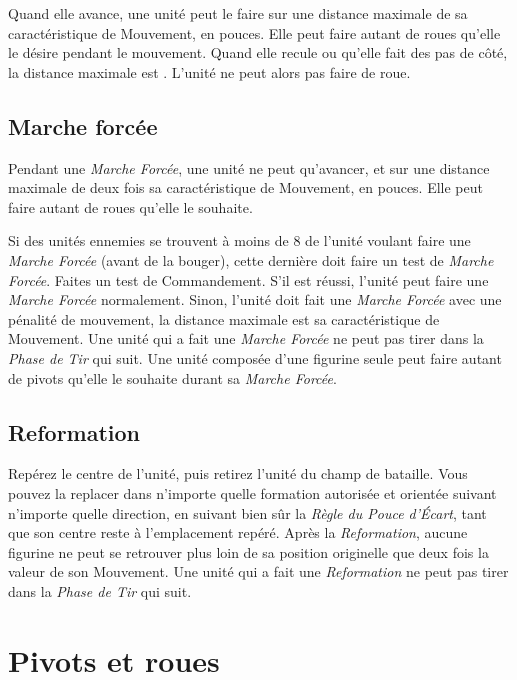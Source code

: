 Quand elle avance, une unité peut le faire sur une distance maximale de sa caractéristique de Mouvement, en pouces. Elle peut faire autant de roues qu'elle le désire pendant le mouvement. Quand elle recule ou qu'elle fait des pas de côté, la distance maximale est . L'unité ne peut alors pas faire de roue.

\subsection{Marche forcée}

Pendant une \emph{Marche Forcée}, une unité ne peut qu'avancer, et sur une distance maximale de deux fois sa caractéristique de Mouvement, en pouces. Elle peut faire autant de roues qu'elle le souhaite.

Si des unités ennemies se trouvent à moins de \unit{8}{\pouce} de l'unité voulant faire une \emph{Marche Forcée} (avant de la bouger), cette dernière doit faire un test de \emph{Marche Forcée}. Faites un test de Commandement. S'il est réussi, l'unité peut faire une \emph{Marche Forcée} normalement. Sinon, l'unité doit fait une \emph{Marche Forcée} avec une pénalité de mouvement, la distance maximale est sa caractéristique de Mouvement. Une unité qui a fait une \emph{Marche Forcée} ne peut pas tirer dans la \emph{Phase de Tir} qui suit. Une unité composée d'une figurine seule peut faire autant de pivots qu'elle le souhaite durant sa \emph{Marche Forcée}.

\subsection{Reformation}

Repérez le centre de l'unité, puis retirez l'unité du champ de bataille. Vous pouvez la replacer dans n'importe quelle formation autorisée et orientée suivant n'importe quelle direction, en suivant bien sûr la \emph{Règle du Pouce d'Écart}, tant que son centre reste à l'emplacement repéré. Après la \emph{Reformation}, aucune figurine ne peut se retrouver plus loin de sa position originelle que deux fois la valeur de son Mouvement. Une unité qui a fait une \emph{Reformation} ne peut pas tirer dans la \emph{Phase de Tir} qui suit.

\section{Pivots et roues}

